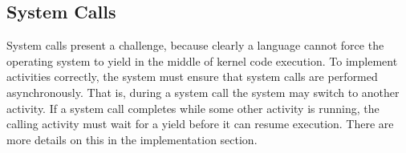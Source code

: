 \documentclass[a4paper,UKenglish,cleveref, autoref]{lipics-v2019}
\begin{document}
\subsection{System Calls}

System calls present a challenge, because clearly a language cannot force the operating system to yield in the middle of kernel code execution.
To implement activities correctly, the system must ensure that system calls are performed asynchronously.
That is, during a system call the system may switch to another activity.
If a system call completes while some other activity is running, the calling activity must wait for a yield before it can resume execution.
There are more details on this in the implementation section.




\end{document}
